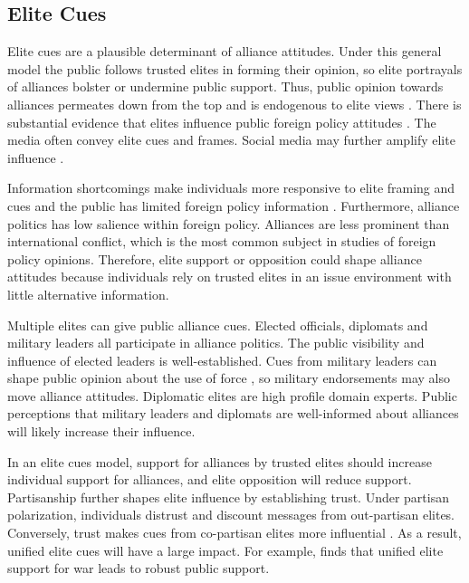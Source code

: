 \documentclass[12pt]{article}
\begin{document}
\subsection{Elite Cues} 

Elite cues are a plausible determinant of alliance attitudes. 
Under this general model the public follows trusted elites in forming their opinion, so elite portrayals of alliances bolster or undermine public support.
Thus, public opinion towards alliances permeates down from the top and is endogenous to elite views \citep{Druckman2014}.
There is substantial evidence that elites influence public foreign policy attitudes \citep{BaumPotter2008}. 
The media often convey elite cues and frames.
Social media may further amplify elite influence \citep{BaumPotter2019}.   


Information shortcomings make individuals more responsive to elite framing and cues \citep{Druckman2001, Peterson2017} and the public has limited foreign policy information \citep{BaumPotter2008}.
Furthermore, alliance politics has low salience within foreign policy. 
Alliances are less prominent than international conflict, which is the most common subject in studies of foreign policy opinions. 
Therefore, elite support or opposition could shape alliance attitudes because individuals rely on trusted elites in an issue environment with little alternative information. 


Multiple elites can give public alliance cues.
Elected officials, diplomats and military leaders all participate in alliance politics.
The public visibility and influence of elected leaders is well-established.  
Cues from military leaders can shape public opinion about the use of force \citep{Golbyetal2018}, so military endorsements may also move alliance attitudes. 
Diplomatic elites are high profile domain experts. 
Public perceptions that military leaders and diplomats are well-informed about alliances will likely increase their influence. 


In an elite cues model, support for alliances by trusted elites should increase individual support for alliances, and elite opposition will reduce support.   
Partisanship further shapes elite influence by establishing trust.
Under partisan polarization, individuals distrust and discount messages from out-partisan elites. 
Conversely, trust makes cues from co-partisan elites more influential \citep{Druckmanetal2013}.
As a result, unified elite cues will have a large impact.
For example, \citet{Berinsky2007} finds that unified elite support for war leads to robust public support. 
\end{document}
